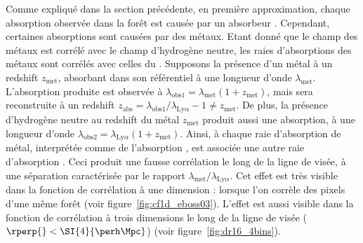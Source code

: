 Comme expliqué dans la section précédente, en première approximation, chaque absorption observée dans la forêt \lya{} est causée par un absorbeur \lya{}. Cependant, certaines absorptions sont causées par des métaux.
Etant donné que le champ des métaux est corrélé avec le champ d'hydrogène neutre, les raies d'absorptions des métaux sont corrélés avec celles du \lya. Supposons la présence d'un métal à un redshift $z_{\mathrm{met}}$, absorbant dans son référentiel à une longueur d'onde $\lambda_{\mathrm{met}}$. L'absorption produite est observée à $\lambda_{\mathrm{obs1}} = \lambda_{\mathrm{met}} ( 1 + z_{\mathrm{met}})$, mais sera reconstruite à un redshift $z_{\mathrm{abs}} = \lambda_{\mathrm{obs1}} / \lambda_{\mathrm{Ly}\alpha} - 1 \neq z_{\mathrm{met}}$. De plus, la présence d'hydrogène neutre au redshift du métal $z_{\mathrm{met}}$ produit aussi une absorption, à une longueur d'onde $\lambda_{\mathrm{obs2}} = \lambda_{\mathrm{Ly}\alpha}(1+z_{\mathrm{met}})$. Ainsi, à chaque raie d'absorption de métal, interprétée comme de l'absorption \lya{}, est associée une autre raie d'absorption \lya{}. Ceci produit une fausse corrélation le long de la ligne de visée, à une séparation caractérisée par le rapport $\lambda_{\mathrm{met}} / \lambda_{\mathrm{Ly}\alpha}$.
Cet effet est très visible dans la fonction de corrélation à une dimension : lorsque l'on corrèle des pixels d'une même forêt (voir figure~\ref{fig:cf1d_eboss03}). L'effet est aussi visible dans la fonction de corrélation à trois dimensions le long de la ligne de visée ($\rperp{} < \SI{4}{\perh\Mpc}$) (voir figure~\ref{fig:dr16_4bins}).


